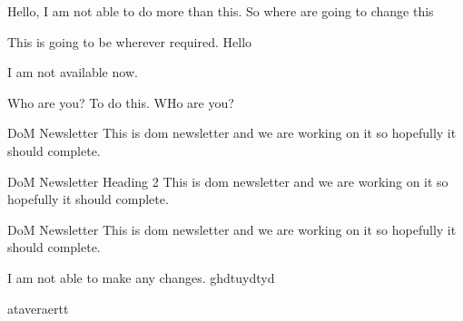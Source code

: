 \documentclass{article}
\begin{document}
Hello, I am not able to do more than this. So where are going to change this

This is going to be wherever required. Hello

I am not available now.

Who are you? To do this. WHo are you?

DoM Newsletter
This is dom newsletter  and we are working on it so hopefully it should complete.

DoM Newsletter Heading 2
This is dom newsletter  and we are working on it so hopefully it should complete.

DoM Newsletter
This is dom newsletter  and we are working on it so hopefully it should complete.

I am not able to make any changes.
ghdtuydtyd


ataveraertt
\end{document}
